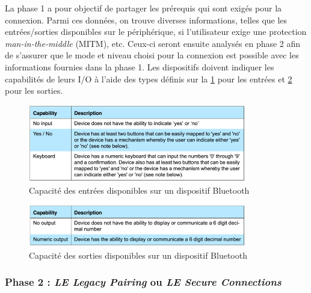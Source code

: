     
La phase 1 a pour objectif de partager les prérequis qui sont exigés pour la connexion.
Parmi ces données, on trouve diverses informations, telles que les entrées/sorties disponibles sur le périphérique, si l'utilisateur exige une protection \textit{man-in-the-middle} (MITM), etc. Ceux-ci seront ensuite analysés en phase 2 afin de s'assurer que le mode et niveau choisi pour la connexion est possible avec les informations fournies dans la phase 1. Les dispositifs doivent indiquer les capabilités de leurs I/O à l'aide des types définis sur la \cref{fig-io_capabilities} pour les entrées et \cref{fig-output_capabilities} pour les sorties.

\begin{figure}[ht!]
    \centering
    \includegraphics[width=0.85\textwidth]{Figures/Security/BLE/io_capabilities.png}
    \caption{Capacité des entrées disponibles sur un dispositif Bluetooth}
    \label{fig-io_capabilities}
\end{figure}

\begin{figure}[ht!]
    \centering
    \includegraphics[width=0.85\textwidth]{Figures/Security/BLE/output_capabilities.png}
    \caption{Capacité des sorties disponibles sur un dispositif Bluetooth}
    \label{fig-output_capabilities}
\end{figure}




    
\subsubsection{Phase 2 : \textit{LE Legacy Pairing} ou \textit{LE Secure Connections}}


